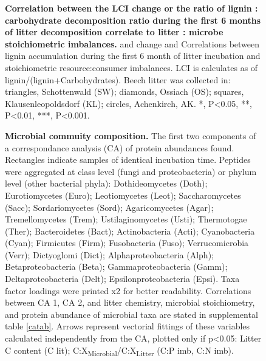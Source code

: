 \documentclass[10pt]{article}
\begin{document}
\begin{flushleft}
\begin{figure}[h!]
\vspace*{2mm}
\begin{center}
\end{center}
\caption{
{\bf Correlation between the LCI change or the ratio of lignin : carbohydrate decomposition ratio during the first 6 months of litter decomposition correlate to litter : microbe stoichiometric imbalances.} and change and Correlations between lignin accumulation during the first 6 month of litter incubation and stoichiometric resource:consumer imbalances. LCI is calculates as of lignin/(lignin+Carbohydrates).  Beech litter was collected in: triangles, Schottenwald (SW); diamonds, Ossiach (OS); squares, Klausenleopoldsdorf (KL); circles, Achenkirch, AK. *, P\textless 0.05, **, P\textless 0.01, ***, P\textless 0.001.}
\label{fig:cor1}
\end{figure}

\begin{figure}[h!]
\vspace*{2mm}
\begin{center}
\end{center}
\caption{
{\bf Microbial commuity composition.} The first two components of a correspondance analysis (CA) of protein abundances found. Rectangles indicate samples of identical incubation time. Peptides were aggregated at class level (fungi and proteobacteria) or phylum level (other bacterial phyla): Dothideomycetes (Doth); Eurotiomycetes (Euro); Leotiomycetes (Leot); Saccharomycetes (Sacc); Sordariomycetes (Sord); Agaricomycetes (Agar); Tremellomycetes (Trem); Ustilaginomycetes (Usti); Thermotogae (Ther); Bacteroidetes (Bact); Actinobacteria (Acti); Cyanobacteria (Cyan); Firmicutes (Firm); Fusobacteria (Fuso); Verrucomicrobia (Verr); Dictyoglomi (Dict); Alphaproteobacteria (Alph); Betaproteobacteria (Beta); Gammaproteobacteria (Gamm); Deltaproteobacteria (Delt); Epsilonproteobacteria (Epsi). Taxa factor loadings were printed x2 for better readability. Correlations between CA 1, CA 2, and litter chemistry, microbial stoichiometry, and protein abundance of microbial taxa are stated in supplemental table \ref{catab}. 
Arrows represent vectorial fittings of these variables calculated independently from the CA, plotted only if p\textless 0.05: Litter C content (C lit); C:X\textsubscript{Microbial}/C:X\textsubscript{Litter} (C:P imb, C:N imb).}
\label{fig:metaprotpca}
\end{figure}


\end{flushleft}
\end{document}
